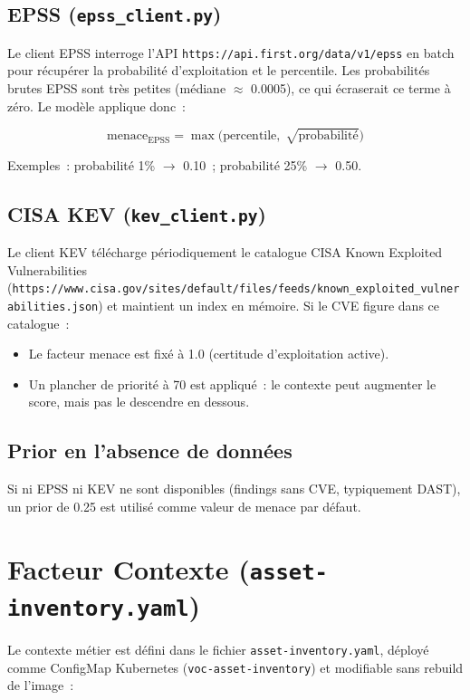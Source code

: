\documentclass[12pt,a4paper]{report}
\begin{document}
\subsection{EPSS (\texttt{epss\_client.py})}
Le client EPSS interroge l'API \texttt{https://api.first.org/data/v1/epss} en batch pour récupérer la probabilité d'exploitation et le percentile. Les probabilités brutes EPSS sont très petites (médiane $\approx$ 0.0005), ce qui écraserait ce terme à zéro. Le modèle applique donc~:

\begin{equation}
\text{menace}_{\text{EPSS}} = \max\!\Big(\text{percentile},\; \sqrt{\text{probabilité}}\Big)
\label{eq:epss}
\end{equation}

Exemples~: probabilité 1\% $\rightarrow$ 0.10~; probabilité 25\% $\rightarrow$ 0.50.

\subsection{CISA KEV (\texttt{kev\_client.py})}
Le client KEV télécharge périodiquement le catalogue CISA Known Exploited Vulnerabilities (\texttt{https://www.cisa.gov/sites/default/files/feeds/known\_exploited\_vulnerabilities.json}) et maintient un index en mémoire. Si le CVE figure dans ce catalogue~:
\begin{itemize}[nosep]
    \item Le facteur menace est fixé à 1.0 (certitude d'exploitation active).
    \item Un plancher de priorité à 70 est appliqué~: le contexte peut augmenter le score, mais pas le descendre en dessous.
\end{itemize}

\subsection{Prior en l'absence de données}
Si ni EPSS ni KEV ne sont disponibles (findings sans CVE, typiquement DAST), un prior de 0.25 est utilisé comme valeur de menace par défaut.

\section{Facteur Contexte (\texttt{asset-inventory.yaml})}
Le contexte métier est défini dans le fichier \texttt{asset-inventory.yaml}, déployé comme ConfigMap Kubernetes (\texttt{voc-asset-inventory}) et modifiable sans rebuild de l'image~:
\end{document}
